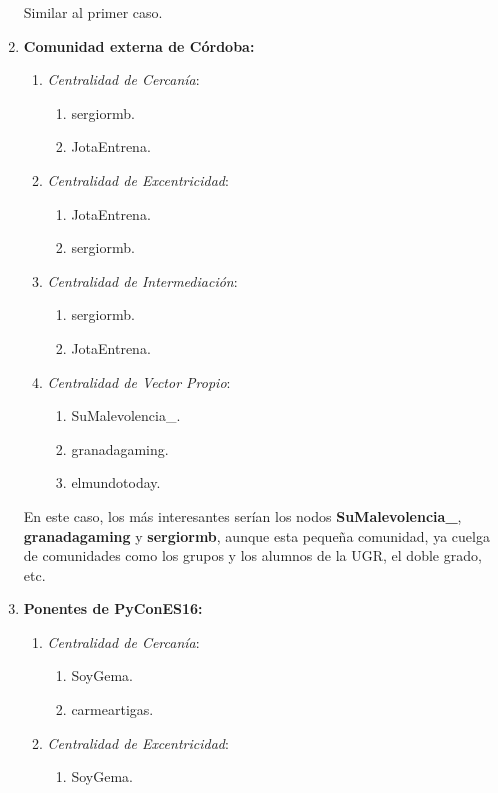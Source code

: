 \documentclass[paper=a4, fontsize=11pt]{article} %
\numberwithin{equation}{section} %
\numberwithin{figure}{section} %
\numberwithin{table}{section} %
\begin{document}
\begin{enumerate}[$\bullet$]
\begin{enumerate}[---]
  \end{enumerate}
  Similar al primer caso.
  \item \textbf{Comunidad externa de Córdoba:}
  \begin{enumerate}[---]
    \item \textit{Centralidad de Cercanía}:
    \begin{enumerate}
      \item sergiormb.
      \item JotaEntrena.
    \end{enumerate}
    \item \textit{Centralidad de Excentricidad}:
    \begin{enumerate}
      \item JotaEntrena.
      \item sergiormb.
    \end{enumerate}
    \item \textit{Centralidad de Intermediación}:
    \begin{enumerate}
      \item sergiormb.
      \item JotaEntrena.
    \end{enumerate}
    \item \textit{Centralidad de Vector Propio}:
    \begin{enumerate}
      \item SuMalevolencia\_. 
      \item granadagaming.
      \item elmundotoday.
    \end{enumerate}
  \end{enumerate}
  En este caso, los más interesantes serían los nodos \textbf{SuMalevolencia\_}, \textbf{granadagaming} y \textbf{sergiormb}, aunque esta pequeña comunidad, ya cuelga de comunidades como los grupos y los alumnos de la UGR, el doble grado, etc.
  \item \textbf{Ponentes de PyConES16:}
  \begin{enumerate}[---]
    \item \textit{Centralidad de Cercanía}:
    \begin{enumerate}
      \item SoyGema.
      \item carmeartigas.
    \end{enumerate}
    \item \textit{Centralidad de Excentricidad}:
    \begin{enumerate}
      \item SoyGema.

\end{enumerate}
\end{enumerate}
\end{enumerate}
\end{document}
